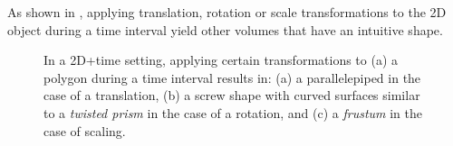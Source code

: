 As shown in , applying translation, rotation or scale transformations to the 2D object during a time interval yield other volumes that have an intuitive shape.
\begin{figure}[tbp]
\centering
{}
\caption[Object transformations in 2D space+time]{In a 2D+time setting, applying certain transformations to (a) a polygon during a time interval results in: (a) a parallelepiped in the case of a translation, (b) a screw shape with curved surfaces similar to a \emph{twisted prism} in the case of a rotation, and (c) a \emph{frustum} in the case of scaling.}
\label{fig:aula-transformations}
\end{figure}

